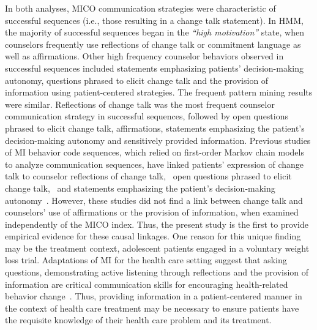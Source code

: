 \documentclass[smallextended]{svjour3}       %
\begin{document}
In both analyses, MICO communication strategies were characteristic of successful sequences (i.e., those resulting in a change talk statement). In HMM, the majority of successful sequences began in the \textit{``high motivation''} state, when counselors frequently use reflections of change talk or commitment language as well as affirmations. Other high frequency counselor behaviors observed in successful sequences included statements emphasizing patients' decision-making autonomy, questions phrased to elicit change talk and the provision of information using patient-centered strategies. The frequent pattern mining results were similar. Reflections of change talk was the most frequent counselor communication strategy in successful sequences, followed by open questions phrased to elicit change talk, affirmations, statements emphasizing the patient's decision-making autonomy and sensitively provided information. Previous studies of MI behavior code sequences, which relied on first-order Markov chain models to analyze communication sequences, have linked patients' expression of change talk to counselor reflections of change talk,~\cite{moyers2009session, gaume2010counselor, glynn2014change, carcone2013provider, jacques2016building} open questions phrased to elicit change talk,~\cite{moyers2009session, carcone2013provider, jacques2016building} and statements emphasizing the patient's decision-making autonomy~\cite{carcone2013provider, jacques2016building}. However, these studies did not find a link between change talk and counselors' use of affirmations or the provision of information, when examined independently of the MICO index. Thus, the present study is the first to provide empirical evidence for these causal linkages. One reason for this unique finding may be the treatment context, adolescent patients engaged in a voluntary weight loss trial. Adaptations of MI for the health care setting suggest that asking questions, demonstrating active listening through reflections and the provision of information are critical communication skills for encouraging health-related behavior change~\cite{douaihy2015motivational}. Thus, providing information in a patient-centered manner in the context of health care treatment may be necessary to ensure patients have the requisite knowledge of their health care problem and its treatment. 
\end{document}
